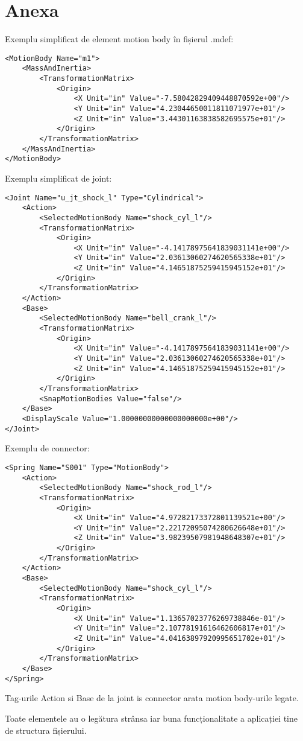\newpage
\section{Anexa}

Exemplu simplificat de element motion body în fișierul .mdef:
\lstset{language=XML}
\begin{lstlisting}
<MotionBody Name="m1">
    <MassAndInertia>
        <TransformationMatrix>
            <Origin>
                <X Unit="in" Value="-7.58042829409448870592e+00"/>
                <Y Unit="in" Value="4.23044650011811071977e+01"/>
                <Z Unit="in" Value="3.44301163838582695575e+01"/>
            </Origin>
        </TransformationMatrix>
    </MassAndInertia>
</MotionBody>
\end{lstlisting}
Exemplu simplificat de joint:

\lstset{language=XML}
\begin{lstlisting}
<Joint Name="u_jt_shock_l" Type="Cylindrical">
    <Action>
        <SelectedMotionBody Name="shock_cyl_l"/>
        <TransformationMatrix>
            <Origin>
                <X Unit="in" Value="-4.14178975641839031141e+00"/>
                <Y Unit="in" Value="2.03613060274620565338e+01"/>
                <Z Unit="in" Value="4.14651875259415945152e+01"/>
            </Origin>
        </TransformationMatrix>
    </Action>
    <Base>
        <SelectedMotionBody Name="bell_crank_l"/>
        <TransformationMatrix>
            <Origin>
                <X Unit="in" Value="-4.14178975641839031141e+00"/>
                <Y Unit="in" Value="2.03613060274620565338e+01"/>
                <Z Unit="in" Value="4.14651875259415945152e+01"/>
            </Origin>
        </TransformationMatrix>
        <SnapMotionBodies Value="false"/>
    </Base>
    <DisplayScale Value="1.00000000000000000000e+00"/>
</Joint>
\end{lstlisting}

Exemplu de connector:

\lstset{language=XML}
\begin{lstlisting}
<Spring Name="S001" Type="MotionBody">
    <Action>
        <SelectedMotionBody Name="shock_rod_l"/>
        <TransformationMatrix>
            <Origin>
                <X Unit="in" Value="4.97282173372801139521e+00"/>
                <Y Unit="in" Value="2.22172095074280626648e+01"/>
                <Z Unit="in" Value="3.98239507981948648307e+01"/>
            </Origin>
        </TransformationMatrix>
    </Action>
    <Base>
        <SelectedMotionBody Name="shock_cyl_l"/>
        <TransformationMatrix>
            <Origin>
                <X Unit="in" Value="1.13657023776269738846e-01"/>
                <Y Unit="in" Value="2.10778191616462606817e+01"/>
                <Z Unit="in" Value="4.04163897920995651702e+01"/>
            </Origin>
        </TransformationMatrix>
    </Base>
</Spring>
\end{lstlisting}

Tag-urile Action si Base de la joint is connector arata motion body-urile legate.

Toate elementele au o legătura strânsa iar buna funcționalitate a aplicației tine de structura fișierului.
